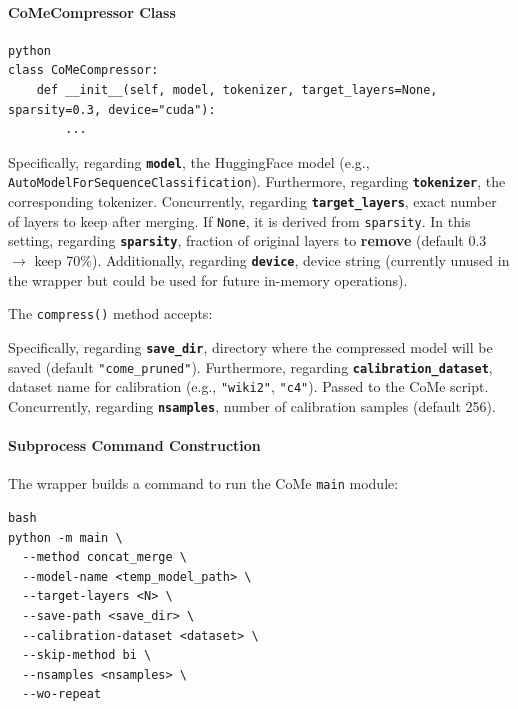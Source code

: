\paragraph{CoMeCompressor Class}

\vspace{0.5em}
\begin{mdframed}[backgroundcolor=codebg, linecolor=codeframe, linewidth=1pt, roundcorner=4pt, innerleftmargin=2pt, innerrightmargin=5pt, innertopmargin=5pt, innerbottommargin=5pt]
\begin{lstlisting}
python
class CoMeCompressor:
    def __init__(self, model, tokenizer, target_layers=None, sparsity=0.3, device="cuda"):
        ...
\end{lstlisting}
\end{mdframed}
\vspace{0.5em}

Specifically, regarding \textbf{\texttt{model}}, the HuggingFace model (e.g., \texttt{AutoModelForSequenceClassification}). Furthermore, regarding \textbf{\texttt{tokenizer}}, the corresponding tokenizer. Concurrently, regarding \textbf{\texttt{target\_layers}}, exact number of layers to keep after merging. If \texttt{None}, it is derived from \texttt{sparsity}. In this setting, regarding \textbf{\texttt{sparsity}}, fraction of original layers to \textbf{remove} (default 0.3 $\rightarrow$ keep 70\%). Additionally, regarding \textbf{\texttt{device}}, device string (currently unused in the wrapper but could be used for future in-memory operations).


The \texttt{compress()} method accepts:

Specifically, regarding \textbf{\texttt{save\_dir}}, directory where the compressed model will be saved (default \texttt{"come\_pruned"}). Furthermore, regarding \textbf{\texttt{calibration\_dataset}}, dataset name for calibration (e.g., \texttt{"wiki2"}, \texttt{"c4"}). Passed to the CoMe script. Concurrently, regarding \textbf{\texttt{nsamples}}, number of calibration samples (default 256).


\paragraph{Subprocess Command Construction}

The wrapper builds a command to run the CoMe \texttt{main} module:

\vspace{0.5em}
\begin{mdframed}[backgroundcolor=codebg, linecolor=codeframe, linewidth=1pt, roundcorner=4pt, innerleftmargin=2pt, innerrightmargin=5pt, innertopmargin=5pt, innerbottommargin=5pt]
\begin{lstlisting}
bash
python -m main \
  --method concat_merge \
  --model-name <temp_model_path> \
  --target-layers <N> \
  --save-path <save_dir> \
  --calibration-dataset <dataset> \
  --skip-method bi \
  --nsamples <nsamples> \
  --wo-repeat
\end{lstlisting}
\end{mdframed}
\vspace{0.5em}

